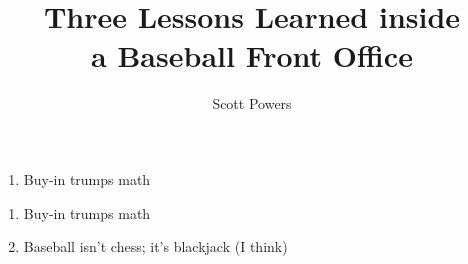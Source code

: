 \documentclass{beamer}
\title{Three Lessons Learned inside\\a Baseball Front Office}
\author{Scott Powers}
\begin{document}
\begin{frame}
  \maketitle
\end{frame}

\begin{frame}
  \begin{enumerate}
    \item Buy-in trumps math
  \end{enumerate}
\end{frame}

\begin{frame}
  \begin{enumerate}
    \item Buy-in trumps math
    \item Baseball isn't chess; it's blackjack (I think)
  \end{enumerate}
\end{frame}
\end{document}

